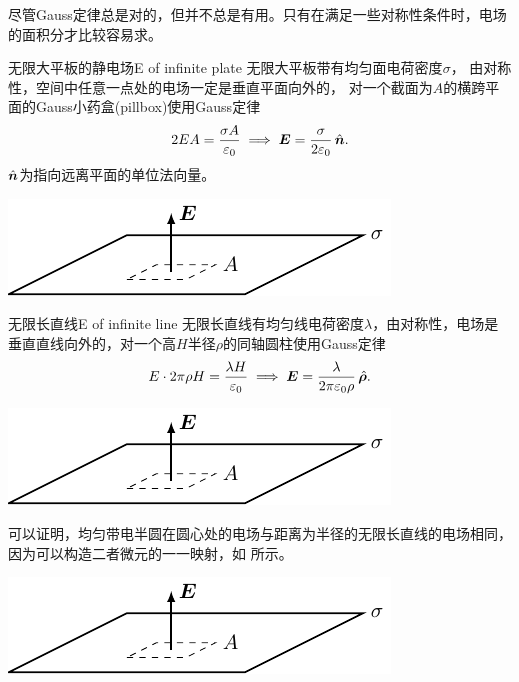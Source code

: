 \begin{remark}
    尽管Gauss定律总是对的，但并不总是有用。只有在满足一些对称性条件时，电场的面积分才比较容易求。%
\end{remark}

\begin{example}{无限大平板的静电场}{E of infinite plate}
    无限大平板带有均匀面电荷密度$\sigma$，%
    由对称性，空间中任意一点处的电场一定是垂直平面向外的，
    对一个截面为$A$的横跨平面的Gauss小药盒(pillbox)使用Gauss定律
    \[
        2EA=\frac{\sigma A}{\varepsilon_0}\implies\bm E=\frac\sigma{2\varepsilon_0}\mathop{}\!\hat{\bm{n}}.
    \]
    $\mathop{}\!\hat{\bm{n}}$为指向远离平面的单位法向量。
    \begin{center}
        \includegraphics[page=1]{figures/tikz/layouts.pdf}
        \label{fig:infinite plate}
    \end{center}
\end{example}
\begin{example}{无限长直线}{E of infinite line}
    无限长直线有均匀线电荷密度$\lambda$，由对称性，电场是垂直直线向外的，对一个高$H$半径$\rho$的同轴圆柱使用Gauss定律
    \[
        E\cdot 2\pi\rho H=\frac{\lambda H}{\varepsilon_0}\implies\bm E=\frac{\lambda}{2\pi\varepsilon_0\rho}\mathop{}\!\hat{\bm{\rho}}.
    \]
    \begin{center}
        \includegraphics[page=2]{figures/tikz/layouts.pdf}
        \label{fig:infinite line}
    \end{center}
    \tcblower
    可以证明，均匀带电半圆在圆心处的电场与距离为半径的无限长直线的电场相同，因为可以构造二者微元的一一映射，如 所示。
    \begin{center}
        \includegraphics[page=3]{figures/tikz/layouts.pdf}
        \label{fig:semicircle <=> line}
    \end{center}
\end{example}

